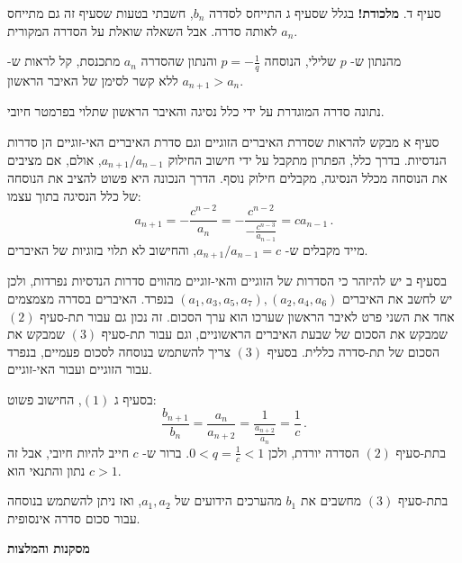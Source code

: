 \documentclass[12pt,a4paper]{article}
\begin{document}
סעיף ד. 
\textbf{מלכודת!}
בגלל שסעיף ג התייחס לסדרה
$b_n$,
חשבתי בטעות שסעיף זה גם מתייחס לאותה סדרה. אבל השאלה שואלת על הסדרה המקורית
$a_n$.

מהנתון ש-%
$p$
שלילי, הנוסחה 
$p=-\displaystyle\frac{1}{q}$
והנתון שהסדרה
$a_n$
מתכנסת, קל לראות ש-%
$a_{n+1}>a_n$
ללא קשר לסימן של האיבר הראשון.

\newpage

\textbf{}
נתונה סדרה המוגדרת על ידי כלל נסיגה והאיבר הראשון שתלוי בפרמטר חיובי.

סעיף א מבקש להראות שסדרת האיברים הזוגיים וגם סדרת האיברים האי-זוגיים הן סדרות הנדסיות. בדרך כלל, הפתרון מתקבל על ידי חישוב החילוק
$a_{n+1}/a_{n-1}$,
אולם, אם מציבים את הנוסחה מכלל הנסיגה, מקבלים חילוק נוסף. הדרך הנכונה היא פשוט להציב את הנוסחה של כלל הנסיגה בתוך עצמו:
\[
a_{n+1} = -\frac{c^{n-2}}{a_n} = -\frac{c^{n-2}}{-\frac{c^{n-3}}{a_{n-1}}} = ca_{n-1}\,.
\]
מייד מקבלים ש-%
$a_{n+1}/a_{n-1}=c$,
והחישוב לא תלוי בזוגיות של האיברים.

בסעיף ב יש להיזהר כי הסדרות של הזוגיים והאי-זוגיים מהווים סדרות הנדסיות נפרדות, ולכן יש לחשב את האיברים
$(a_1,a_3,a_5,a_7), (a_2,a_4,a_6)$
בנפרד. האיברים בסדרה מצמצמים אחד את השני פרט לאיבר הראשון שערכו הוא ערך הסכום. זה נכון גם עבור תת-סעיף 
$(2)$
שמבקש את הסכום של שבעת האיברים הראשוניים, וגם עבור תת-סעיף
$(3)$
שמבקש את הסכום של תת-סדרה כללית. בסעיף 
$(3)$
צריך להשתמש בנוסחה לסכום פעמיים, בנפרד עבור הזוגיים ועבור האי-זוגיים.

בסעיף ג
$(1)$,
החישוב פשוט:
\[
\frac{b_{n+1}}{b_n} = \frac{a_n}{a_{n+2}} =  \frac{1}{\frac{a_{n+2}}{a_n}} = \frac{1}{c}\,.
\]
בתת-סעיף
$(2)$
הסדרה יורדת, ולכן
$0 < q=\frac{1}{c} < 1$.
ברור ש-%
$c$
חייב להיות חיובי, אבל זה נתון והתנאי הוא
$c>1$.

בתת-סעיף 
$(3)$
מחשבים את 
$b_1$
מהערכים הידועים של 
$a_1,a_2$,
ואז ניתן להשתמש בנוסחה עבור סכום סדרה אינסופית.


\newpage

\begin{center}
\textbf{מסקנות והמלצות}
\end{center}
\end{document}
